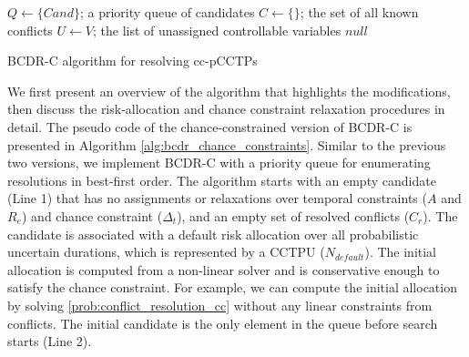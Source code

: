 \documentclass[jair,twoside,11pt,theapa]{article}
\begin{document}
\begin{algorithm}[h!]
	\SetAlgoLined
	\Indm
	\Initialize{}
	\;
	{$Q\leftarrow\{\mathit{Cand}\}$; a priority queue of candidates}\;
	{$C\leftarrow\{\}$; the set of all known conflicts}\;
	{$U\leftarrow V$; the list of unassigned controllable variables}\;
	\Indm
	\Algorithm{}
	\Indp
	\Return $null$\;
\caption{BCDR-C algorithm for resolving cc-pCCTPs}
\label{alg:bcdr_chance_constraints}
\end{algorithm}


We first present an overview of the algorithm that highlights the modifications,
then discuss the risk-allocation and chance constraint relaxation procedures in
detail. The pseudo code of the chance-constrained version of BCDR-C is presented
in Algorithm \ref{alg:bcdr_chance_constraints}. Similar to the previous two
versions, we implement BCDR-C with a priority queue for enumerating resolutions
in best-first order. The algorithm starts with an empty candidate (Line 1) that
has no assignments or relaxations over temporal constraints ($A$ and $R_{e}$)
and chance constraint ($\Delta_t$), and an empty set of resolved conflicts
($C_r$). The candidate is associated with a default risk allocation over all
probabilistic uncertain durations, which is represented by a CCTPU
($N_{default}$). The initial allocation is computed from a non-linear solver and
is conservative enough to satisfy the chance constraint. For example, we can
compute the initial allocation by solving \ref{prob:conflict_resolution_cc}
without any linear constraints from conflicts.  The initial candidate is the
only element in the queue before search starts (Line 2).
\end{document}
